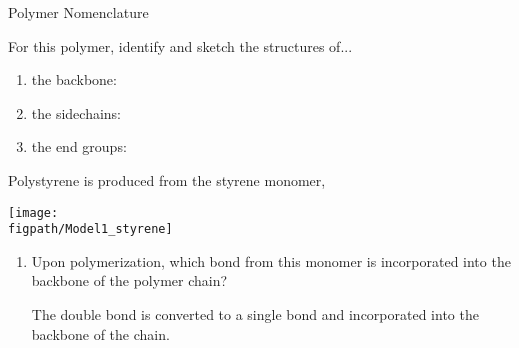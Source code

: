 \begin{activity}{Polymer Nomenclature}
\begin{ctqs}
		For this polymer, identify and sketch the structures of...
		\begin{enumerate}
			\item the backbone:
			
				\begin{solution}[0.75in]\studentdisplay{
					~
				}\end{solution}
			
			\item the sidechains:
			
				\begin{solution}[0.5in]\studentdisplay{
					~
				}\end{solution}
			
			\item the end groups:
			
				\begin{solution}[0.5in]\studentdisplay{
					~
				}\end{solution}
			
			
		\end{enumerate}
		
	\question Polystyrene is produced from the styrene monomer,
	
		\centerline{\texttt{[image: \\figpath/Model1\_styrene]}}
	
		\begin{enumerate}
			\item Upon polymerization, which bond from this monomer is incorporated into the backbone of the polymer chain?
			
				\begin{solution}[0.5in]
				
					The double bond is converted to a single bond and incorporated into the backbone of the chain.
					

\end{solution}
\end{enumerate}
\end{ctqs}
\end{activity}
